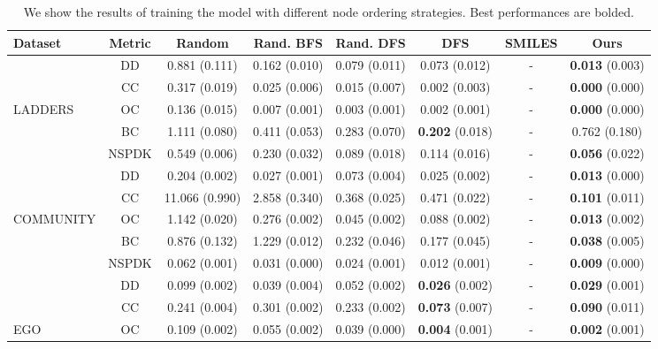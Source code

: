 \begin{table}
    \scriptsize
    \centering
    \caption{We show the results of training the model with different node ordering strategies. Best performances are bolded.}
    \label{tab:graph-ordering-qualitative}
    \renewcommand{\arraystretch}{1.2}
    \begin{tabular}{lccccccc}
        \toprule
        \textbf{Dataset} & \textbf{Metric} & \textbf{Random} & \textbf{Rand. BFS} & \textbf{Rand. DFS} & \textbf{DFS} & \textbf{SMILES} & \textbf{Ours}\\
        \midrule
          & DD             & 0.881 (0.111) & 0.162 (0.010) & 0.079 (0.011) & 0.073 (0.012) & - & \textbf{0.013} (0.003)\\
          & CC             & 0.317 (0.019) & 0.025 (0.006) & 0.015 (0.007) & 0.002 (0.003) & - & \textbf{0.000} (0.000)\\
LADDERS   & OC             & 0.136 (0.015) & 0.007 (0.001) & 0.003 (0.001) & 0.002 (0.001) & - & \textbf{0.000} (0.000)\\
          & BC             & 1.111 (0.080) & 0.411 (0.053) & 0.283 (0.070) & \textbf{0.202} (0.018) & - & 0.762 (0.180)\\
          & NSPDK          & 0.549 (0.006) & 0.230 (0.032) & 0.089 (0.018) & 0.114 (0.016) & - & \textbf{0.056} (0.022)\\
        \midrule
          & DD             & 0.204 (0.002) & 0.027 (0.001) & 0.073 (0.004) & 0.025 (0.002) & - & \textbf{0.013} (0.000)\\
          & CC             & 11.066 (0.990) & 2.858 (0.340) & 0.368 (0.025) & 0.471 (0.022) & - & \textbf{0.101} (0.011)\\
COMMUNITY & OC             & 1.142 (0.020) & 0.276 (0.002) & 0.045 (0.002) & 0.088 (0.002) & - & \textbf{0.013} (0.002)\\
          & BC             & 0.876 (0.132) & 1.229 (0.012) & 0.232 (0.046) & 0.177 (0.045) & - & \textbf{0.038} (0.005)\\
          & NSPDK          & 0.062 (0.001) & 0.031 (0.000) & 0.024 (0.001) & 0.012 (0.001) & - & \textbf{0.009} (0.000)\\
        \midrule
          & DD             & 0.099 (0.002) & 0.039 (0.004) & 0.052 (0.002) & \textbf{0.026} (0.002) & - & \textbf{0.029} (0.001)\\
          & CC             & 0.241 (0.004) & 0.301 (0.002) & 0.233 (0.002) & \textbf{0.073} (0.007) & - & \textbf{0.090} (0.011)\\
EGO       & OC             & 0.109 (0.002) & 0.055 (0.002) & 0.039 (0.000) & \textbf{0.004} (0.001) & - & \textbf{0.002} (0.001)\\

\end{tabular}
\end{table}
